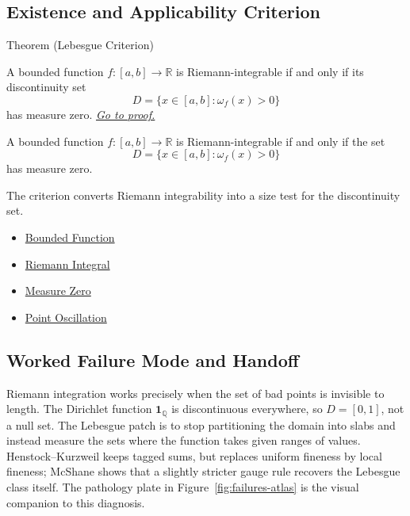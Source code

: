 \subsection*{Existence and Applicability Criterion}

\begin{theorembox}{Theorem (Lebesgue Criterion)}
\begin{theorem}
\label{thm:lebesgue-criterion-riemann-integrability}
A bounded function \(f:[a,b]\to\mathbb R\) is Riemann-integrable if and only
if its discontinuity set
\[
  D=\{x\in[a,b]:\omega_f(x)>0\}
\]
has measure zero.
\hyperref[prf:lebesgue-criterion-riemann-integrability]{\textit{Go to proof.}}
\end{theorem}
\end{theorembox}

\begin{remark*}
A bounded function \(f:[a,b]\to\mathbb R\) is Riemann-integrable if and only
if the set
\[
  D=\{x\in[a,b]:\omega_f(x)>0\}
\]
has measure zero.
\end{remark*}

\begin{remark*}[Interpretation]
The criterion converts Riemann integrability into a size test for the
discontinuity set.
\end{remark*}

\begin{dependencies}
\begin{itemize}
  \item \hyperref[def:function-bounded]{Bounded Function}
  \item \hyperref[def:riemann-integral]{Riemann Integral}
  \item \hyperref[def:measure-zero]{Measure Zero}
  \item \hyperref[def:point-oscillation-integration]{Point Oscillation}
\end{itemize}
\end{dependencies}

\subsection*{Worked Failure Mode and Handoff}

\begin{remark*}[Interpretation]
Riemann integration works precisely when the set of bad points is invisible to
length. The Dirichlet function \(\mathbf 1_{\mathbb Q}\) is discontinuous
everywhere, so \(D=[0,1]\), not a null set. The Lebesgue patch is to stop
partitioning the domain into slabs and instead measure the sets where the
function takes given ranges of values. Henstock--Kurzweil keeps tagged sums,
but replaces uniform fineness by local fineness; McShane shows that a slightly
stricter gauge rule recovers the Lebesgue class itself. The pathology plate
in Figure~\ref{fig:failures-atlas} is the visual companion to this diagnosis.
\end{remark*}

